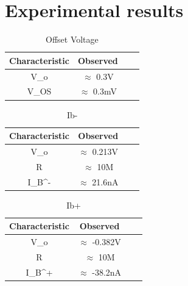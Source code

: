 \documentclass[12pt]{article}
\begin{document}
\section{Experimental results}
\begin{table}[!hbt]
		\begin{center}
		\caption{Offset Voltage}
		\begin{tabular}{|c|c|c|c|}
			\hline
			Characteristic & Observed \\
			\hline
			V_{o}  & $\approx$ 0.3V   \\
			\hline
			V_{OS}   & $\approx$ 0.3mV   \\
			\hline
		    
            
		\end{tabular}
		\end{center}
\end{table}



\newpage

\begin{table}[!hbt]
		\begin{center}
		\caption{Ib-}
		\begin{tabular}{|c|c|c|c|}
			\hline
			Characteristic & Observed \\
			\hline
			V_{o}  & $\approx$ 0.213V   \\
			\hline
			R   & $\approx$ 10M\Omega   \\
			\hline
			I_{B}^{-}   & $\approx$ 21.6nA   \\
			\hline
		    
            
		\end{tabular}
		\end{center}
\end{table}

\begin{table}[!hbt]
		\begin{center}
		\caption{Ib+}
		\begin{tabular}{|c|c|c|c|}
			\hline
			Characteristic & Observed \\
			\hline
			V_{o}  & $\approx$ -0.382V   \\
			\hline
			R   & $\approx$ 10M\Omega   \\
			\hline
			I_{B}^{+}   & $\approx$ -38.2nA   \\
			\hline
		    
            
		\end{tabular}
		\end{center}
\end{table}
\end{document}
